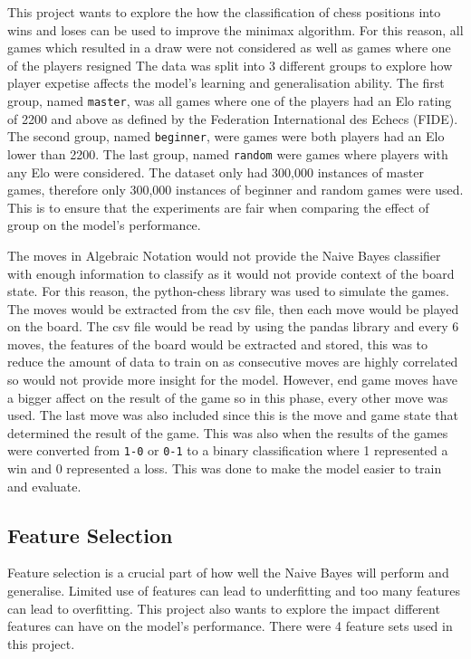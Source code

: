This project wants to explore the how the classification of chess positions into wins and loses can be used to improve the minimax algorithm. For this reason, all games which resulted in a draw were not considered as well as games where one of the players resigned The data was split into 3 different groups to explore how player expetise affects the model's learning and generalisation ability. The first group, named \texttt{master}, was all games where one of the players had an Elo rating of 2200 and above as defined by the Federation International des Echecs (FIDE). The second group, named \texttt{beginner}, were games were both players had an Elo lower than 2200. The last group, named \texttt{random} were games where players with any Elo were considered. The dataset only had 300,000 instances of master games, therefore only 300,000 instances of beginner and random games were used. This is to ensure that the experiments are fair when comparing the effect of group on the model's performance. 

The moves in Algebraic Notation would not provide the Naive Bayes classifier with enough information to classify as it would not provide context of the board state. For this reason, the python-chess library was used to simulate the games. The moves would be extracted from the csv file, then each move would be played on the board. The csv file would be read by using the pandas library and every 6 moves, the features of the board would be extracted and stored, this was to reduce the amount of data to train on as consecutive moves are highly correlated so would not provide more insight for the model. However, end game moves have a bigger affect on the result of the game so in this phase, every other move was used. The last move was also included since this is the move and game state that determined the result of the game. This was also when the results of the games were converted from \texttt{1-0} or \texttt{0-1} to a binary classification where 1 represented a win and 0 represented a loss. This was done to make the model easier to train and evaluate.

\subsection{Feature Selection}

Feature selection is a crucial part of how well the Naive Bayes will perform and generalise. Limited use of features can lead to underfitting and too many features can lead to overfitting. This project also wants to explore the impact different features can have on the model's performance. There were 4 feature sets used in this project. 

